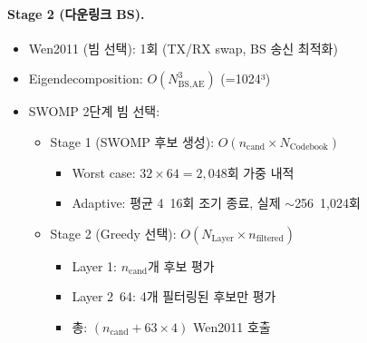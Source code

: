 \documentclass[10pt]{article}
\begin{document}
\paragraph{Stage 2 (다운링크 BS).}
\begin{itemize}
    \item Wen2011 (빔 선택): 1회 (TX/RX swap, BS 송신 최적화)
    \item Eigendecomposition: $O(N_{\text{BS,AE}}^3)$ (=1024³)
    \item SWOMP 2단계 빔 선택:
    \begin{itemize}
        \item Stage 1 (SWOMP 후보 생성): $O(n_{\text{cand}} \times N_{\text{Codebook}})$
        \begin{itemize}
            \item Worst case: $32 \times 64 = 2{,}048$회 가중 내적
            \item Adaptive: 평균 4~16회 조기 종료, 실제 $\sim$256~1,024회
        \end{itemize}
        \item Stage 2 (Greedy 선택): $O(N_{\text{Layer}} \times n_{\text{filtered}})$
        \begin{itemize}
            \item Layer 1: $n_{\text{cand}}$개 후보 평가
            \item Layer 2~64: 4개 필터링된 후보만 평가
            \item 총: $(n_{\text{cand}} + 63 \times 4)$ Wen2011 호출
        \end{itemize}
    \end{itemize}
\end{itemize}
\end{document}
